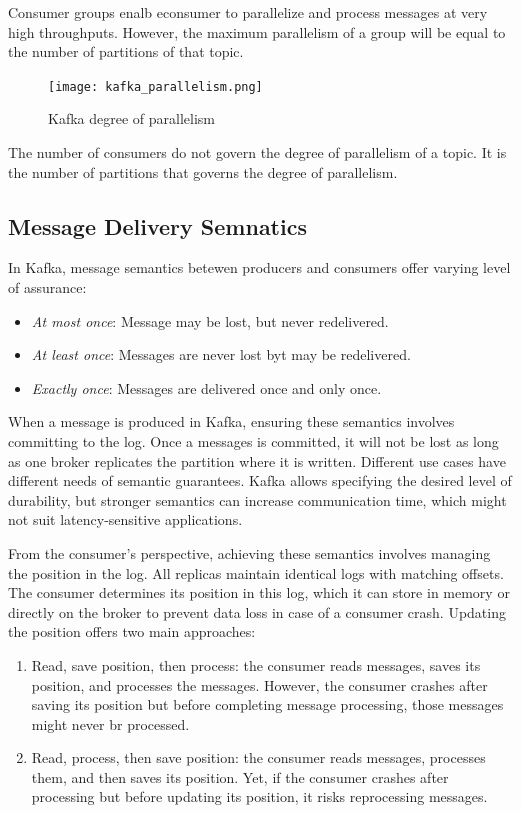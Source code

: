 Consumer groups enalb econsumer to parallelize and process messages at very
high throughputs. However, the maximum parallelism of a group will be equal to
the number of partitions of that topic.

\begin{figure}[ht]
    \centering
    \texttt{[image: kafka\_parallelism.png]}
    \caption{Kafka degree of parallelism}
\end{figure}

The number of consumers do not govern the degree of parallelism of a topic.
It is the number of partitions that governs the degree of parallelism.

\subsection{Message Delivery Semnatics}

In Kafka, message semantics betewen producers and consumers offer varying
level of assurance:

\begin{itemize}
    \item   \textit{At most once}: Message may be lost, but never redelivered.
    \item   \textit{At least once}: Messages are never lost byt may be
            redelivered.
    \item   \textit{Exactly once}: Messages are delivered once and only once.
\end{itemize}

When a message is produced in Kafka, ensuring these semantics involves
committing to the log. Once a messages is committed, it will not be lost as long
as one broker replicates the partition where it is written.
Different use cases have different needs of semantic guarantees. Kafka allows
specifying the desired level of durability, but stronger semantics can increase
communication time, which might not suit latency-sensitive applications.

From the consumer's perspective, achieving these semantics involves managing
the position in the log. All replicas maintain identical logs with matching
offsets. The consumer determines its position in this log, which it can store
in memory or directly on the broker to prevent data loss in case of a consumer
crash.
Updating the position offers two main approaches:
\begin{enumerate}
    \item   Read, save position, then process: the consumer reads messages,
            saves its position, and processes the messages. However, the
            consumer crashes after saving its position but before completing
            message processing, those messages might never br processed.
    \item   Read, process, then save position: the consumer reads messages,
            processes them, and then saves its position. Yet, if the consumer
            crashes after processing but before updating its position, it risks
            reprocessing messages.
\end{enumerate}

